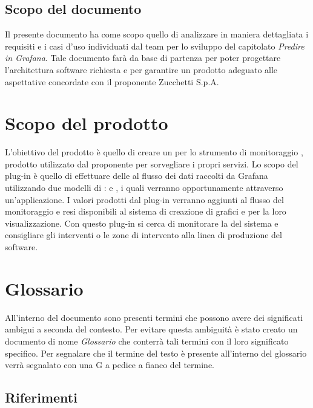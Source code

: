 \documentclass[../analisi-dei-requisiti.tex]{subfiles}
\begin{document}
\subsection{Scopo del documento}%
\label{sub:scopo_del_documento}
Il presente documento ha come scopo quello di analizzare in maniera dettagliata i requisiti e i casi d’uso individuati dal team per lo sviluppo del capitolato \emph{Predire in Grafana}. Tale documento farà da base di partenza per poter progettare l’architettura software richiesta e per garantire un prodotto adeguato alle aspettative concordate con il proponente Zucchetti S.p.A.

\section{Scopo del prodotto}%
\label{sub:scopo_del_prodotto}
L’obiettivo del prodotto è quello di creare un  per lo strumento di monitoraggio , prodotto utilizzato dal proponente per sorvegliare i propri servizi. Lo scopo del plug-in è quello di effettuare delle  al flusso dei dati raccolti da Grafana utilizzando due modelli di :  e , i quali verranno opportunamente  attraverso un’applicazione. I valori prodotti dal plug-in verranno aggiunti al flusso del monitoraggio e resi disponibili al sistema di creazione di grafici e  per la loro visualizzazione. Con questo plug-in si cerca di monitorare la  del sistema e consigliare gli interventi o le zone di intervento alla linea di produzione del software.

\section{Glossario}
\label{sub:glossario}
All’interno del documento sono presenti termini che possono avere dei significati ambigui a seconda del contesto. Per evitare questa ambiguità è stato creato un documento di nome  \textit{Glossario} che conterrà tali termini con il loro significato specifico. Per segnalare che il termine del testo è presente all’interno del glossario verrà segnalato con una G a pedice a fianco del termine.

\subsection{Riferimenti}%
\label{sub:riferimenti}
\end{document}

